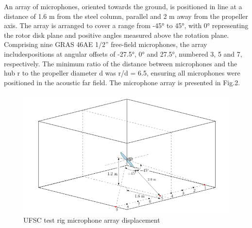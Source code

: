 \documentclass[10pt,fleqn,a4paper,twoside]{article}
\begin{document}
An array of microphones, oriented towards the ground, is positioned in line at a distance of 1.6 m from the steel column, parallel and 2 m away from the propeller axis. The array is arranged to cover a range from -45° to 45°, with 0° representing the rotor disk plane and positive angles measured above the rotation plane. Comprising nine GRAS 46AE 1/2” free-field microphones, the array includespositions at angular offsets of -27.5°, 0° and 27.5°, numbered 3, 5 and 7, respectively. The minimum ratio of the distance between microphones and the hub r to the propeller diameter d was r/d = 6.5, ensuring all microphones were positioned in the acoustic far field. The microphone array is presented in Fig.2.
\clearpage
\begin{figure}[h!]
    \centering
    \includegraphics[angle=0, scale=0.320]{Figures/ufsc_microphone_array.png}
    \caption{UFSC test rig microphone array displacement}
    \label{fig2}
    \end{figure}
\end{document}
